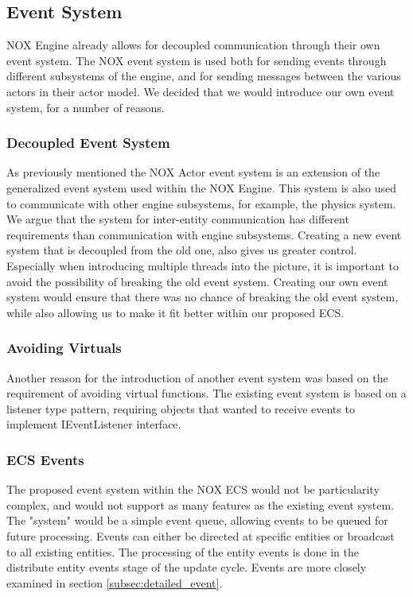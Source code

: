 \subsection{Event System}
NOX Engine already allows for decoupled communication through their own event system.
The NOX event system is used both for sending events through different subsystems of the engine, and for sending messages between the various actors in their actor model.
We decided that we would introduce our own event system, for a number of reasons.

\subsubsection{Decoupled Event System}
As previously mentioned the NOX Actor event system is an extension of the generalized event system used within the NOX Engine. 
This system is also used to communicate with other engine subsystems, for example, the physics system.
We argue that the system for inter-entity communication has different requirements than communication with engine subsystems.
Creating a new event system that is decoupled from the old one, also gives us greater control.
Especially when introducing multiple threads into the picture, it is important to avoid the possibility of breaking the old event system.
Creating our own event system would ensure that there was no chance of breaking the old event system, while also allowing us to make it fit better within our proposed ECS.

\subsubsection{Avoiding Virtuals}
Another reason for the introduction of another event system was based on the requirement of avoiding virtual functions.
The existing event system is based on a listener type pattern, requiring objects that wanted to receive events to implement IEventListener interface.

\subsubsection{ECS Events}
The proposed event system within the NOX ECS would not be particularity complex, and would not support as many features as the existing event system.
The "system" would be a simple event queue, allowing events to be queued for future
processing. Events can either be directed at specific entities or broadcast to all existing entities.
The processing of the entity events is done in the distribute entity events stage of the update cycle.
Events are more closely examined in section \ref{subsec:detailed_event}.
